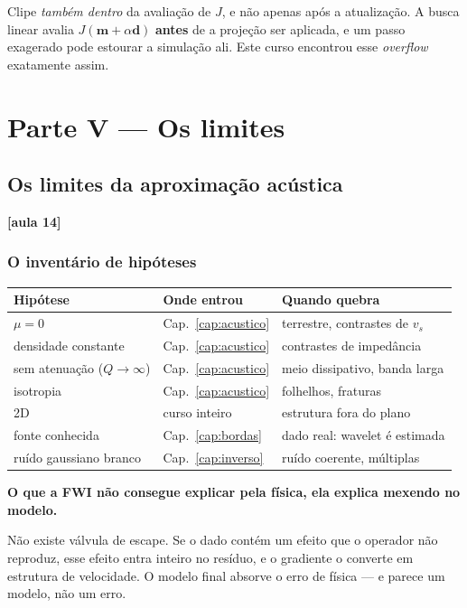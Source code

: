 \documentclass[11pt,a4paper,oneside]{report}
\newcommand{\aula}[1]{\textcolor{cianofwi}{\textbf{[aula #1]}}}
\begin{document}
\begin{atencao}
Clipe \emph{também dentro} da avaliação de $J$, e não apenas após a
atualização. A busca linear avalia $J(\mathbf{m}+\alpha\mathbf{d})$
\textbf{antes} de a projeção ser aplicada, e um passo exagerado pode estourar
a simulação ali. Este curso encontrou esse \emph{overflow} exatamente assim.
\end{atencao}

\part*{\centering\color{azulfwi} Parte V --- Os limites}

\chapter{Os limites da aproximação acústica}
\label{cap:limites}

\aula{14}

\section{O inventário de hipóteses}

\begin{center}
\begin{tabular}{@{}lll@{}}
\toprule
\textbf{Hipótese} & \textbf{Onde entrou} & \textbf{Quando quebra} \\
\midrule
$\mu = 0$ & Cap.~\ref{cap:acustico} & terrestre, contrastes de $v_s$ \\
densidade constante & Cap.~\ref{cap:acustico} & contrastes de impedância \\
sem atenuação ($Q\to\infty$) & Cap.~\ref{cap:acustico} & meio dissipativo, banda larga \\
isotropia & Cap.~\ref{cap:acustico} & folhelhos, fraturas \\
2D & curso inteiro & estrutura fora do plano \\
fonte conhecida & Cap.~\ref{cap:bordas} & dado real: wavelet é estimada \\
ruído gaussiano branco & Cap.~\ref{cap:inverso} & ruído coerente, múltiplas \\
\bottomrule
\end{tabular}
\end{center}

\begin{armadilha}
\textbf{O que a FWI não consegue explicar pela física, ela explica mexendo no
modelo.}

Não existe válvula de escape. Se o dado contém um efeito que o operador não
reproduz, esse efeito entra inteiro no resíduo, e o gradiente o converte em
estrutura de velocidade. O modelo final absorve o erro de física --- e parece
um modelo, não um erro.
\end{armadilha}
\end{document}

